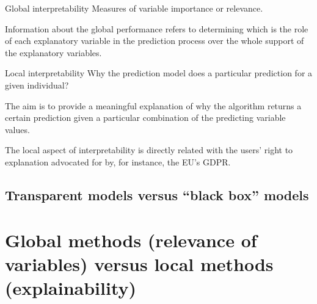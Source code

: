 \begin{definition}{Global interpretability}{}
	Measures of variable importance or relevance.

	Information about the global performance refers to determining which
	is the role of each explanatory variable in the prediction
	process over the whole support of the explanatory variables.
\end{definition}

\begin{definition}{Local interpretability}{}
	Why the prediction model does a particular prediction for a given individual?

	The aim is to provide a meaningful explanation of why the algorithm returns a
	certain prediction given a particular combination of the predicting variable values.

	\tcblower

	\begin{note}
		The local aspect of interpretability is directly related with the users’
		right to explanation advocated for by, for instance, the EU’s GDPR.
	\end{note}
\end{definition}

\subsection{Transparent models versus ``black box'' models}

\section{Global methods (relevance of variables) versus local methods (explainability)}
